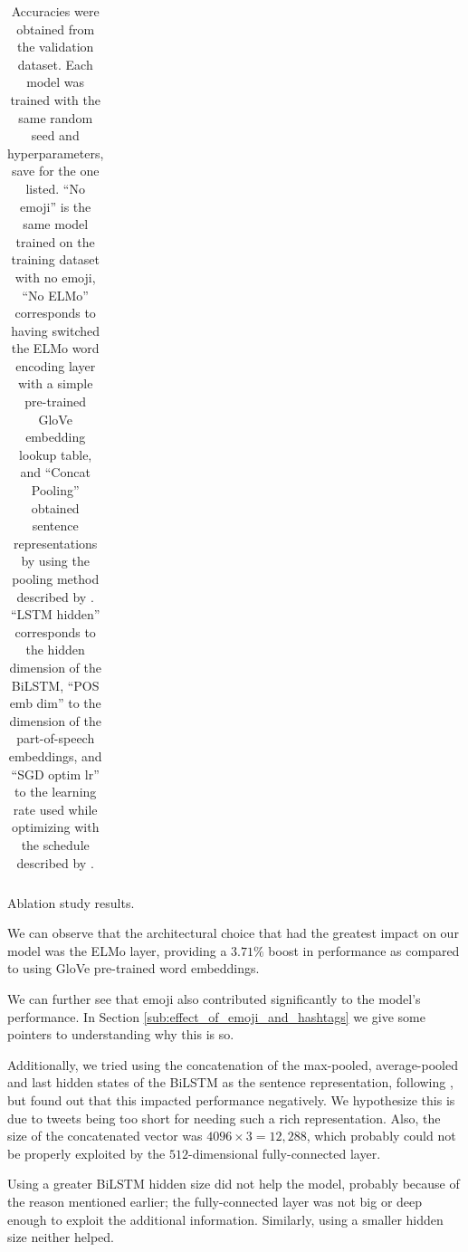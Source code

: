 \documentclass[11pt,a4paper]{article}
\begin{document}
\begin{table}[!h]
\begin{tabular}{lcc}
    \end{tabular}

    \caption{Ablation study results.}
    \vspace{-0.4cm}
    \caption*{
        \footnotesize Accuracies were obtained from the
        validation dataset. Each model was trained with the same random seed and
        hyperparameters, save for the one listed. ``No emoji'' is the same model
        trained on the training dataset with no emoji, ``No ELMo'' corresponds
        to having switched the ELMo word encoding layer with a simple
        pre-trained GloVe embedding lookup table, and ``Concat Pooling''
        obtained sentence representations by using the pooling method described
        by \citet{howard2018universal}. ``LSTM hidden'' corresponds to the
        hidden dimension of the BiLSTM, ``POS emb dim'' to the dimension of the
        part-of-speech embeddings, and ``SGD optim lr'' to the learning rate
        used while optimizing with the schedule described by \citet{conneau2017supervised}.}

    \label{table:ablation}

\end{table}



We can observe that the architectural choice that had the greatest impact on our
model was the ELMo layer, providing a $3.71\%$ boost in performance as compared
to using GloVe pre-trained word embeddings.

We can further see that emoji also contributed significantly to the model's
performance. In Section \ref{sub:effect_of_emoji_and_hashtags} we give some
pointers to understanding why this is so.  

Additionally, we tried using the concatenation of the max-pooled, average-pooled
and last hidden states of the BiLSTM as the sentence representation, following
\citet{howard2018universal}, but found out that this impacted performance
negatively. We hypothesize this is due to tweets being too short for needing
such a rich representation. Also, the size of the concatenated vector was
$4096\times3=12,288$, which probably could not be properly exploited by the
$512$-dimensional fully-connected layer.

Using a greater BiLSTM hidden size did not help the model, probably because of
the reason mentioned earlier; the fully-connected layer was not big or deep enough
to exploit the additional information. Similarly, using a smaller hidden size
neither helped.
\end{document}
